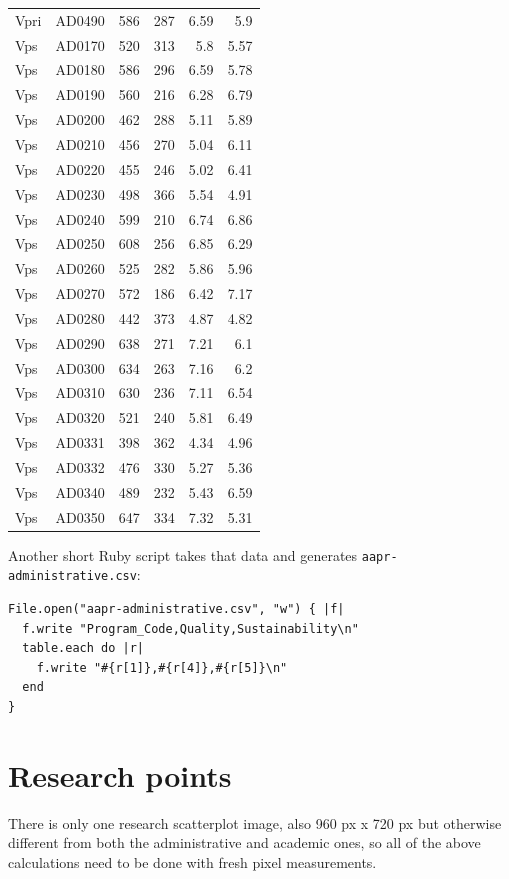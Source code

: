 \documentclass[article,10pt,microtype]{article}
\begin{document}
\begin{longtable}{llrrrr}
Vpri & AD0490 & 586 & 287 & 6.59 & 5.9\\
Vps & AD0170 & 520 & 313 & 5.8 & 5.57\\
Vps & AD0180 & 586 & 296 & 6.59 & 5.78\\
Vps & AD0190 & 560 & 216 & 6.28 & 6.79\\
Vps & AD0200 & 462 & 288 & 5.11 & 5.89\\
Vps & AD0210 & 456 & 270 & 5.04 & 6.11\\
Vps & AD0220 & 455 & 246 & 5.02 & 6.41\\
Vps & AD0230 & 498 & 366 & 5.54 & 4.91\\
Vps & AD0240 & 599 & 210 & 6.74 & 6.86\\
Vps & AD0250 & 608 & 256 & 6.85 & 6.29\\
Vps & AD0260 & 525 & 282 & 5.86 & 5.96\\
Vps & AD0270 & 572 & 186 & 6.42 & 7.17\\
Vps & AD0280 & 442 & 373 & 4.87 & 4.82\\
Vps & AD0290 & 638 & 271 & 7.21 & 6.1\\
Vps & AD0300 & 634 & 263 & 7.16 & 6.2\\
Vps & AD0310 & 630 & 236 & 7.11 & 6.54\\
Vps & AD0320 & 521 & 240 & 5.81 & 6.49\\
Vps & AD0331 & 398 & 362 & 4.34 & 4.96\\
Vps & AD0332 & 476 & 330 & 5.27 & 5.36\\
Vps & AD0340 & 489 & 232 & 5.43 & 6.59\\
Vps & AD0350 & 647 & 334 & 7.32 & 5.31\\
\end{longtable}

Another short Ruby script takes that data and generates \texttt{aapr-administrative.csv}:

\begin{verbatim}
File.open("aapr-administrative.csv", "w") { |f|
  f.write "Program_Code,Quality,Sustainability\n"
  table.each do |r|
    f.write "#{r[1]},#{r[4]},#{r[5]}\n"
  end
}
\end{verbatim}

\section*{Research points}
\label{sec-3}

There is only one research scatterplot image, also 960 px x 720 px but otherwise different from both the administrative and academic ones, so all of the above calculations need to be done with fresh pixel measurements.
\end{document}
